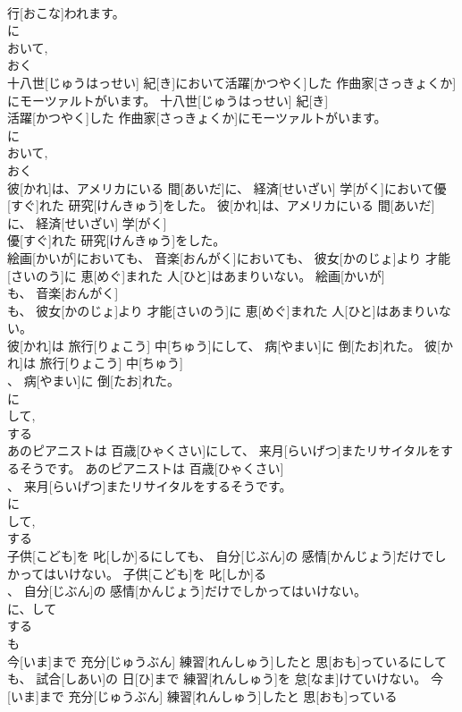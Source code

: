 \documentclass[8pt]{extreport}
\begin{document}
\begin{CJK}{UTF8}{min}
\\	行[おこな]われます。	
\\	に 
\\	おいて, 
\\	おく 
\\	十八世[じゅうはっせい] 紀[き]において活躍[かつやく]した 作曲家[さっきょくか]にモーツァルトがいます。	十八世[じゅうはっせい] 紀[き]
\\	活躍[かつやく]した 作曲家[さっきょくか]にモーツァルトがいます。	
\\	に 
\\	おいて, 
\\	おく 
\\	彼[かれ]は、アメリカにいる 間[あいだ]に、 経済[せいざい] 学[がく]において優[すぐ]れた 研究[けんきゅう]をした。	彼[かれ]は、アメリカにいる 間[あいだ]に、 経済[せいざい] 学[がく]
\\	優[すぐ]れた 研究[けんきゅう]をした。	
\\	絵画[かいが]においても、 音楽[おんがく]においても、 彼女[かのじょ]より 才能[さいのう]に 恵[めぐ]まれた 人[ひと]はあまりいない。	絵画[かいが]
\\	も、 音楽[おんがく]
\\	も、 彼女[かのじょ]より 才能[さいのう]に 恵[めぐ]まれた 人[ひと]はあまりいない。	
\\	彼[かれ]は 旅行[りょこう] 中[ちゅう]にして、 病[やまい]に 倒[たお]れた。	彼[かれ]は 旅行[りょこう] 中[ちゅう]
\\	、 病[やまい]に 倒[たお]れた。	
\\	に 
\\	して, 
\\	する 
\\	あのピアニストは 百歳[ひゃくさい]にして、 来月[らいげつ]またリサイタルをするそうです。	あのピアニストは 百歳[ひゃくさい]
\\	、 来月[らいげつ]またリサイタルをするそうです。	
\\	に 
\\	して, 
\\	する 
\\	子供[こども]を 叱[しか]るにしても、 自分[じぶん]の 感情[かんじょう]だけでしかってはいけない。	子供[こども]を 叱[しか]る
\\	、 自分[じぶん]の 感情[かんじょう]だけでしかってはいけない。	
\\	に、して 
\\	する 
\\	も
\\	今[いま]まで 充分[じゅうぶん] 練習[れんしゅう]したと 思[おも]っているにしても、 試合[しあい]の 日[ひ]まで 練習[れんしゅう]を 怠[なま]けていけない。	今[いま]まで 充分[じゅうぶん] 練習[れんしゅう]したと 思[おも]っている

\end{CJK}
\end{document}
